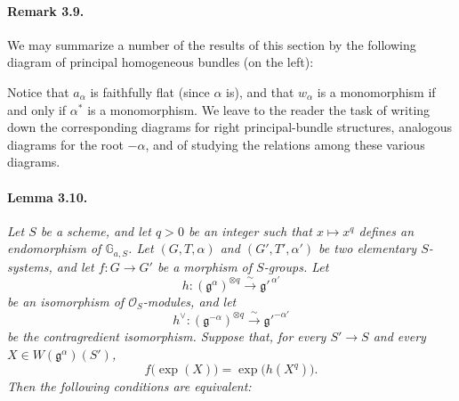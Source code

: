 \paragraph{\textbf{Remark 3.9.}}
We may summarize a number of the results of this section by the
following diagram of principal homogeneous bundles (on the left):

\begin{center}
  \begin{minipage}{\textwidth}
  \centering

  \smallskip
  \end{minipage}
\end{center}

Notice that \(a_\alpha\) is faithfully flat (since \(\alpha\) is),
and that \(w_\alpha\) is a monomorphism if and only if
\(\alpha^\ast\) is a monomorphism.  We leave to the reader the task
of writing down the corresponding diagrams for right
principal-bundle structures, analogous diagrams for the root
\(-\alpha\), and of studying the relations among these various
diagrams.

\paragraph{\textbf{Lemma 3.10.}}
\emph{Let \(S\) be a scheme, and let \(q>0\) be an integer such that
\(x\mapsto x^q\) defines an endomorphism of \(\mathbb G_{a,S}\).
Let \((G,T,\alpha)\) and \((G',T',\alpha')\) be two elementary
\(S\)-systems, and let \(f\colon G\to G'\) be a morphism of
\(S\)-groups.  Let}
\[
  h\colon(\mathfrak g^\alpha)^{\otimes q}
    \xrightarrow{\ \sim\ }\mathfrak g'^{\,\alpha'}
\]
\emph{be an isomorphism of \(\mathcal O_S\)-modules, and let}
\[
  h^\vee\colon(\mathfrak g^{-\alpha})^{\otimes q}
    \xrightarrow{\ \sim\ }\mathfrak g'^{-\alpha'}
\]
\emph{be the contragredient isomorphism.  Suppose that, for every
\(S'\to S\) and every \(X\in W(\mathfrak g^\alpha)(S')\),}
\[
  f\bigl(\exp(X)\bigr)=\exp\bigl(h(X^q)\bigr).
\]
\emph{Then the following conditions are equivalent:}

